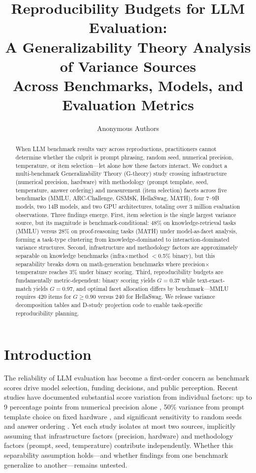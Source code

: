 \documentclass[11pt,twocolumn]{article}
\title{Reproducibility Budgets for LLM Evaluation:\\A Generalizability Theory Analysis of Variance Sources\\Across Benchmarks, Models, and Evaluation Metrics}
\author{
Anonymous Authors
}
\date{}
\begin{document}
\maketitle

\begin{abstract}
When LLM benchmark results vary across reproductions, practitioners cannot determine whether the culprit is prompt phrasing, random seed, numerical precision, temperature, or item selection---let alone how these factors interact. We conduct a multi-benchmark Generalizability Theory (G-theory) study crossing infrastructure (numerical precision, hardware) with methodology (prompt template, seed, temperature, answer ordering) and measurement (item selection) facets across five benchmarks (MMLU, ARC-Challenge, GSM8K, HellaSwag, MATH), four 7--9B models, two 14B models, and two GPU architectures, totaling over 3 million evaluation observations. Three findings emerge. First, item selection is the single largest variance source, but its magnitude is benchmark-conditional: 48\% on knowledge-retrieval tasks (MMLU) versus 28\% on proof-reasoning tasks (MATH) under model-as-facet analysis, forming a task-type clustering from knowledge-dominated to interaction-dominated variance structures. Second, infrastructure and methodology factors are approximately separable on knowledge benchmarks (infra$\times$method $<$0.5\% binary), but this separability breaks down on math-generation benchmarks where precision$\times$temperature reaches 3\% under binary scoring. Third, reproducibility budgets are fundamentally metric-dependent: binary scoring yields $G=0.37$ while text-exact-match yields $G=0.97$, and optimal facet allocation differs by benchmark---MMLU requires 420 items for $G\geq0.90$ versus 240 for HellaSwag. We release variance decomposition tables and D-study projection code to enable task-specific reproducibility planning.
\end{abstract}

\section{Introduction}

The reliability of LLM evaluation has become a first-order concern as benchmark scores drive model selection, funding decisions, and public perception. Recent studies have documented substantial score variation from individual factors: up to 9 percentage points from numerical precision alone \citep{yuan2025}, 50\% variance from prompt template choice on fixed hardware \citep{mizrahi2024}, and significant sensitivity to random seeds and answer ordering \citep{lu2022,pezeshkpour2024}. Yet each study isolates at most two sources, implicitly assuming that infrastructure factors (precision, hardware) and methodology factors (prompt, seed, temperature) contribute independently. Whether this separability assumption holds---and whether findings from one benchmark generalize to another---remains untested.
\end{document}

